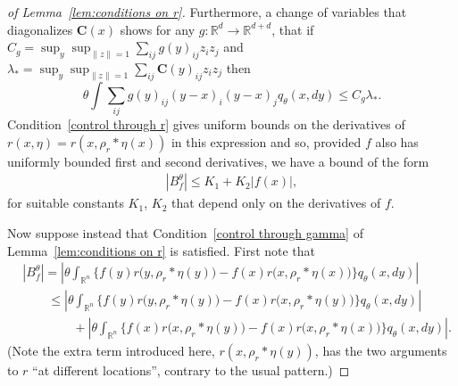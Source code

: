 \documentclass[EJP]{ejpecp} %
\newcommand{\IR}{\mathbb R}
\newcommand{\covq}{\mathbf{C}}     %
\newcommand{\kernel}{\rho}  %
\newcommand{\smooth}[1]{\kernel_{#1} \! * \!}  %
\begin{document}
\begin{proof}[of Lemma~\ref{lem:conditions on r}]
Furthermore, a change of variables that diagonalizes $\covq(x)$
shows for any $g : \IR^d \to \IR^{d + d}$,
that if $C_g = \sup_y \sup_{\|z\| = 1} \sum_{ij} g(y)_{ij} z_i z_j$
and $\lambda_* = \sup_y \sup_{\|z\|=1} \sum_{ij} \covq(y)_{ij} z_i z_j$
then
$$ \theta \int \sum_{ij} g(y)_{ij} (y-x)_i (y-x)_j q_\theta(x, dy) \le C_g \lambda_* .  $$
Condition~\ref{control through r} 
gives uniform bounds on the derivatives of $r(x,\eta) = r(x,\rho_r*\eta(x))$
in this expression and so, provided $f$ also has uniformly bounded first and second derivatives,
we have a bound of the form
\begin{align*}
    |B^\theta_f| \leq K_1 + K_2 |f(x)| ,
\end{align*}
for suitable constants $K_1$, $K_2$ that depend only on the derivatives of $f$.

Now suppose instead that
Condition~\ref{control through gamma} of Lemma~\ref{lem:conditions on r} is satisfied.
First note that
\begin{align}
	    \nonumber
    & |B_f^\theta| =
        \left| \theta 
            \int_{\IR^n} 
                \big\{
                    f(y) r\big(y,\smooth{r}\eta(y)\big)
                    -
                    f(x) r\big(x,\smooth{r}\eta(x)\big)
                \big\}
            q_{\theta}(x,dy)
        \right|
    \\ 
 \label{eqn:q_bound_split}
	    &\qquad {} \leq
        \left| \theta 
            \int_{\IR^n} 
                \big\{
                    f(y) r\big(y,\smooth{r}\eta(y)\big)
                    -
                    f(x) r\big(x,\smooth{r}\eta(y)\big)
                \big\}
            q_{\theta}(x,dy)
        \right|
    \\ 
\nonumber
	    &\qquad \qquad {}  +
        \left| \theta 
            \int_{\IR^n} 
                \big\{
                    f(x) r\big(x,\smooth{r}\eta(y)\big)
                    -
                    f(x) r\big(x,\smooth{r}\eta(x)\big)
                \big\}
            q_{\theta}(x,dy) 
        \right| .
\end{align}
(Note the extra term introduced here,
$r(x,\smooth{r}\eta(y))$, has the two arguments to $r$
``at different locations'', contrary to the usual pattern.)



\end{proof}
\end{document}
